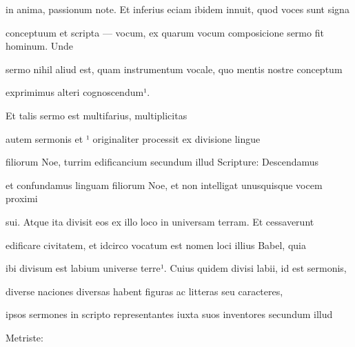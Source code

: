 in anima, passionum note. Et inferius eciam ibidem innuit, quod voces sunt signa

conceptuum et scripta — vocum, ex quarum vocum composicione sermo fit hominum. Unde

sermo nihil aliud est, quam instrumentum vocale, quo mentis nostre conceptum

\splitlines{}

exprimimus alteri cognoscendum¹.

\indentK  Et talis sermo est multifarius, multiplicitas

\fulllines{}
autem sermonis et ¹ originaliter processit ex divisione lingue

filiorum Noe, turrim edificancium secundum illud Scripture: Descendamus

et confundamus linguam filiorum Noe, et non intelligat unusquisque vocem proximi

sui. Atque ita divisit eos ex illo loco in universam terram. Et cessaverunt

edificare civitatem, et idcirco vocatum est nomen loci illius Babel, quia

ibi divisum est labium universe terre¹. Cuius quidem divisi labii, id est sermonis,

diverse naciones diversas habent figuras ac litteras seu caracteres,



\fullpreviouslines
{
\color{blue}


ipsos sermones in scripto representantes iuxta suos inventores secundum illud

Metriste:

}


